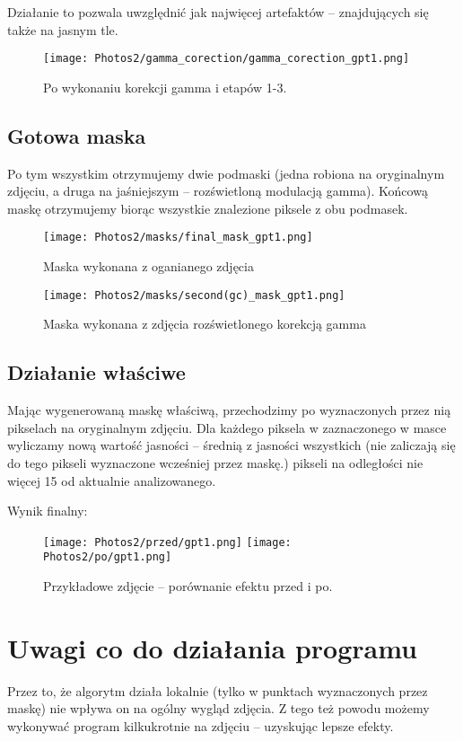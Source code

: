 \documentclass[]{mwart}
\begin{document}
Działanie to pozwala uwzględnić jak najwięcej artefaktów
-- znajdujących się także na jasnym tle.

\begin{figure}[H]
    \centering
    \texttt{[image: Photos2/gamma\_corection/gamma\_corection\_gpt1.png]}
    \caption{Po wykonaniu korekcji gamma i etapów 1-3.}
\end{figure}

\newpage
\subsection{Gotowa maska}
Po tym wszystkim otrzymujemy dwie podmaski (jedna robiona na oryginalnym
zdjęciu, a druga na jaśniejszym -- rozświetloną modulacją gamma).
Końcową maskę otrzymujemy biorąc wszystkie znalezione piksele z obu podmasek.

\begin{figure}[H]
    \centering
    \texttt{[image: Photos2/masks/final\_mask\_gpt1.png]}
    \caption{Maska wykonana z oganianego zdjęcia}
\end{figure}
\begin{figure}[H]
    \centering
    \texttt{[image: Photos2/masks/second(gc)\_mask\_gpt1.png]}
    \caption{Maska wykonana z zdjęcia rozświetlonego korekcją gamma}
\end{figure}


\newpage
\subsection{Działanie właściwe}
Mając wygenerowaną maskę właściwą, przechodzimy po wyznaczonych
przez nią pikselach na oryginalnym zdjęciu. Dla każdego piksela w
zaznaczonego w masce wyliczamy nową wartość jasności -- średnią z
jasności wszystkich (nie zaliczają się do tego pikseli wyznaczone
wcześniej przez maskę.) pikseli na odległości nie więcej 15 od aktualnie analizowanego.

Wynik finalny:
\begin{figure}[H]
    \centering
    \texttt{[image: Photos2/przed/gpt1.png]}
    \texttt{[image: Photos2/po/gpt1.png]}
    \caption{Przykładowe zdjęcie -- porównanie efektu przed i po.}

\end{figure}

\newpage
\section{Uwagi co do działania programu}
Przez to, że algorytm działa lokalnie (tylko w punktach wyznaczonych
przez maskę) nie wpływa on na ogólny wygląd zdjęcia.
Z tego też powodu możemy wykonywać program kilkukrotnie na zdjęciu
-- uzyskując lepsze efekty.
\end{document}
